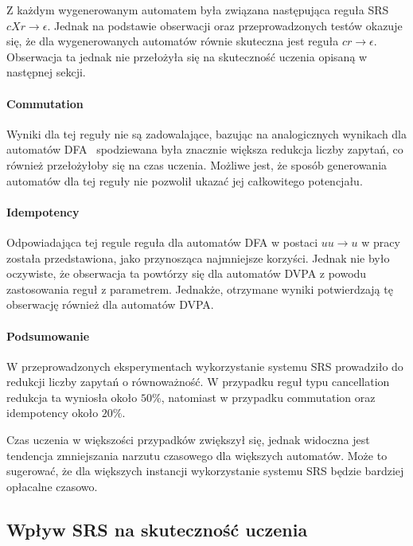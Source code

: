 

Z każdym wygenerowanym automatem była związana następująca reguła SRS $cXr \rightarrow \epsilon$.
Jednak na podstawie obserwacji oraz przeprowadzonych testów okazuje się, że dla wygenerowanych automatów
równie skuteczna jest reguła $cr \rightarrow \epsilon$. Obserwacja ta jednak nie przełożyła się na skuteczność
uczenia opisaną w następnej sekcji.

\paragraph{Commutation}



Wyniki dla tej reguły nie są zadowalające, bazując na analogicznych wynikach dla automatów DFA~\cite{srs}
spodziewana była znacznie większa redukcja liczby zapytań, co również przełożyłoby się na czas uczenia.
Możliwe jest, że sposób generowania automatów dla tej reguły nie pozwolił ukazać jej całkowitego potencjału.

\paragraph{Idempotency}



Odpowiadająca tej regule reguła dla automatów DFA w postaci $uu \rightarrow u$ w pracy~\cite{srs}
została przedstawiona, jako przynosząca najmniejsze korzyści. Jednak nie było oczywiste, że obserwacja
ta powtórzy się dla automatów DVPA z powodu zastosowania reguł z parametrem.
Jednakże, otrzymane wyniki potwierdzają tę obserwację również dla automatów DVPA.

\paragraph{Podsumowanie}
W przeprowadzonych eksperymentach wykorzystanie systemu SRS prowadziło do redukcji liczby zapytań o równoważność.
W przypadku reguł typu cancellation redukcja ta wyniosła około $50\%$, natomiast w przypadku commutation 
oraz idempotency około $20\%$.

Czas uczenia w większości przypadków zwiększył się, jednak widoczna jest tendencja zmniejszania narzutu czasowego dla większych automatów.
Może to sugerować, że dla większych instancji wykorzystanie systemu SRS będzie bardziej opłacalne czasowo.


\subsection{Wpływ SRS na skuteczność uczenia}

